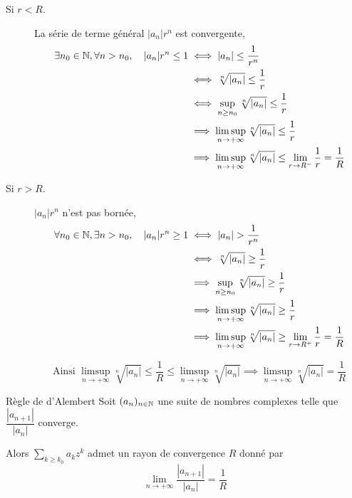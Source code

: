 \documentclass[a4paper,12pt]{article}
\begin{document}
\begin{demonstration}
    \begin{description}
        \item[Si $r < R$.] 
        La série de terme général $|a_n|r^n$ est convergente,
        \begin{align*}
            \exists n_0 \in \mathbb{N}, \forall n > n_0, \quad |a_n| r^n \leq 1 &\iff |a_n| \leq \frac{1}{r^n} \\
            &\iff \sqrt[n]{|a_n|} \leq \frac{1}{r} \\
            &\iff \sup_{n \geq n_0} \sqrt[n]{|a_n|} \leq \frac{1}{r} \\
            &\implies \limsup_{n \to +\infty} \sqrt[n]{|a_n|} \leq \frac{1}{r} \\
            &\implies \limsup_{n \to +\infty} \sqrt[n]{|a_n|} \leq \lim_{r \to R^-} \frac{1}{r} = \frac{1}{R}
        \end{align*}
    
        \item[Si $r > R$.]
        $|a_n| r^n$ n'est pas bornée,
        \begin{align*}
            \forall n_0 \in \mathbb{N}, \exists n > n_0, \quad |a_n| r^n \geq 1 &\iff |a_n| > \frac{1}{r^n} \\
            &\iff \sqrt[n]{|a_n|} \geq \frac{1}{r} \\
            &\implies \sup_{n \geq n_0} \sqrt[n]{|a_n|} \geq \frac{1}{r} \\
            &\implies \limsup_{n \to +\infty} \sqrt[n]{|a_n|} \geq \frac{1}{r} \\
            &\implies \limsup_{n \to +\infty} \sqrt[n]{|a_n|} \geq \lim_{r \to R^+} \frac{1}{r} = \frac{1}{R}
        \end{align*}

        $$
        \text{Ainsi } \limsup_{n \to +\infty} \sqrt[n]{|a_n|} \leq \frac{1}{R} \leq \limsup_{n \to +\infty} \sqrt[n]{|a_n|} \implies \limsup\limits_{n \to +\infty} \sqrt[n]{|a_n|} = \dfrac{1}{R}
        $$
    \end{description}
\end{demonstration}

\begin{corollaire}{Règle de d'Alembert}{}
    Soit $(a_n)_{n \in \mathbb{N}}$ une suite de nombres complexes telle que $\dfrac{|a_{n+1}|}{|a_n|}$ converge.

    Alors $\sum\limits_{k \geq k_0} a_k z^k$ admet un rayon de convergence $R$ donné par
    $$
    \lim_{n \to +\infty} \frac{|a_{n+1}|}{|a_n|} = \frac{1}{R}
    $$
\end{corollaire}
\end{document}
